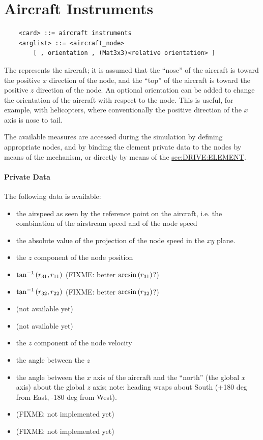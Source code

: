 \section{Aircraft Instruments}
\begin{verbatim}
    <card> ::= aircraft instruments
    <arglist> ::= <aircraft_node>
        [ , orientation , (Mat3x3)<relative orientation> ]
\end{verbatim}
The  represents the aircraft; it is assumed
that the ``nose'' of the aircraft is toward the positive $x$ direction
of the node, and the ``top'' of the aircraft is toward the positive 
$z$ direction of the node.
An optional orientation can be added to change the orientation 
of the aircraft with respect to the node.
This is useful, for example, with helicopters, where conventionally
the positive direction of the $x$ axis is nose to tail.

The available measures are accessed during the simulation 
by defining appropriate  nodes, and by binding
the  element private data to the nodes 
by means of the  mechanism, or directly by means
of the 
\hyperref{\kw{element} drive}{\kw{element} drive (see Section~}{)}{sec:DRIVE:ELEMENT}.

\paragraph{Private Data}
The following data is available:
\begin{itemize}
\item {} the airspeed as seen by the reference 
	point on the aircraft, i.e. the combination 
	of the airstream speed and of the node speed
\item {} the absolute value of the projection
	of the node speed in the $xy$ plane.
\item {} the $z$ component of the node position
\item {} $\tan^{-1}\left( r_{31}, r_{11} \right)$
	(FIXME: better $\arcsin\left( r_{31} \right)$?)
\item {} $\tan^{-1}\left( r_{32}, r_{22} \right)$
	(FIXME: better $\arcsin\left( r_{32} \right)$?)
\item {} (not available yet)
\item {} (not available yet)
\item {} the $z$ component of the node velocity
\item {} the angle between the $z$ 
\item {} the angle between the $x$ axis of the aircraft 
	and the ``north'' (the global $x$ axis) about the global $z$ axis;
	note: heading wraps about South
	(+180 deg from East, -180 deg from West).
\item {} (FIXME: not implemented yet)
\item {} (FIXME: not implemented yet)
\end{itemize}


